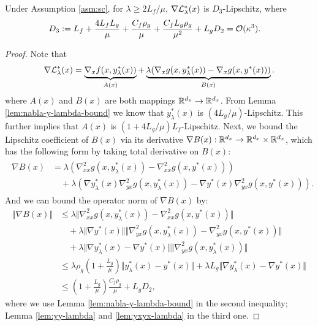 \begin{lem} \label{lem:nabla2-bound}
Under Assumption \ref{asm:sc}, for $\lambda \ge 2L_f /\mu$, $ \nabla {\mathcal{L}}_{\lambda}^*(x)$ is $D_3$-Lipschitz, where
\begin{align*}
    D_3 &:= L_f + \frac{4L_f L_g}{\mu} +\frac{C_f \rho_g}{\mu} +  \frac{C_f L_g \rho_g}{\mu^2} + L_g D_2 = {\mathcal{O}}(\kappa^3).
\end{align*}
\end{lem}

\begin{proof}
Note that
\begin{align} \label{eq:nabla-AB}
    \nabla {\mathcal{L}}_{\lambda}^*(x) = \underbrace{\nabla_x f(x,y_{\lambda}^*(x))}_{A(x)} + \underbrace{\lambda ( \nabla_x g(x,y_{\lambda}^*(x)) - \nabla_x g(x,y^*(x)))}_{B(x)}. 
\end{align}
where $A(x)$ and $B(x)$ are both mappings  ${\mathbb{R}}^{d_x} \rightarrow {\mathbb{R}}^{d_x}$. 
From Lemma \ref{lem:nabla-y-lambda-bound} we know that $y_{\lambda}^*(x)$ is $(4L_g/\mu)$-Lipschitz. This further implies that $A(x)$ is  $(1+4L_g/\mu)L_f$-Lipschitz. Next, we bound the Lipschitz  coefficient of $B(x)$ via its derivative $\nabla B(x): {\mathbb{R}}^{d_x} \rightarrow {\mathbb{R}}^{d_x} \times {\mathbb{R}}^{d_x} $, which has the following form by 
taking total derivative on $B(x)$:
\begin{align} \label{eq:nabla-Bx}
\begin{split}
    \nabla B(x) &= 
    \lambda (\nabla_{xx}^2 g(x,y_{\lambda}^*(x))-\nabla_{xx}^2 g(x,y^*(x))) \\
    &\quad + \lambda \left(\nabla y_{\lambda}^*(x)  \nabla_{yx}^2 g(x,y_{\lambda}^*(x)) - \nabla y^*(x) \nabla_{yx}^2 g(x,y^*(x)) \right).
\end{split}
\end{align}
And we can bound the operator norm of $\nabla B(x)$ by:
\begin{align*}
    \Vert \nabla B(x) \Vert &\le  \lambda \Vert \nabla_{xx}^2 g(x,y_{\lambda}^*(x)) - \nabla_{xx}^2 g(x,y^*(x)) \Vert \\
    &\quad + \lambda \Vert \nabla y^*(x) \Vert \Vert \nabla_{yx}^2 g(x,y_{\lambda}^*(x)) - \nabla_{yx}^2 g(x,y^*(x)) \Vert \\
    &\quad  + \lambda \Vert \nabla y_{\lambda}^*(x) - \nabla y^*(x) \Vert \Vert \nabla_{yx}^2 g(x,y_{\lambda}^*(x)) \Vert\\
    &\le  \lambda \rho_g \left(1+ \frac{L_g}{\mu} \right) \Vert y_{\lambda}^*(x) - y^*(x) \Vert +\lambda L_g \Vert \nabla y_{\lambda}^*(x) - \nabla y^*(x) \Vert  \\
    &\le  \left(1+ \frac{L_g}{\mu} \right) \frac{C_f \rho_g}{\mu} +L_g D_2,
\end{align*}
where we use Lemma \ref{lem:nabla-y-lambda-bound}
in the second inequality; Lemma \ref{lem:yy-lambda} and \ref{lem:yxyx-lambda} in the third one.
\end{proof}


